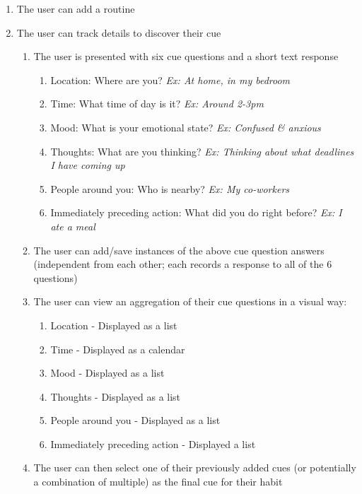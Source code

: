     \begin{enumerate}
        \item The user can add a routine
        \item The user can track details to discover their cue 
            \begin{enumerate}
                \item The user is presented with six cue questions and a short text response
                    \begin{enumerate}
                        \item Location: Where are you? \textit{Ex: At home, in my bedroom}
                        \item Time: What time of day is it? \textit{Ex: Around 2-3pm}
                        \item Mood: What is your emotional state? \textit{Ex: Confused \& anxious}
                        \item Thoughts: What are you thinking? \textit{Ex: Thinking about what deadlines I have coming up}
                        \item People around you: Who is nearby? \textit{Ex: My co-workers}
                        \item Immediately preceding action: What did you do right before? \textit{Ex: I ate a meal}
                    \end{enumerate}
                \item The user can add/save instances of the above cue question answers (independent from each other; each records a response to all of the 6 questions)
                \item The user can view an aggregation of their cue questions in a visual way:
                    \begin{enumerate}
                        \item Location - Displayed as a list
                        \item Time - Displayed as a calendar
                        \item Mood - Displayed as a list
                        \item Thoughts - Displayed as a list
                        \item People around you - Displayed as a list
                        \item Immediately preceding action - Displayed a list
                    \end{enumerate}
                \item The user can then select one of their previously added cues (or potentially a combination of multiple) as the final cue for their habit

\end{enumerate}
\end{enumerate}
